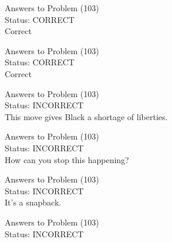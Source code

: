 \documentclass[11pt]{article}
\begin{document}
\begin{minipage}[t]{0.5\textwidth}
  {\centering
  
  Answers to Problem (103)\\
  Status: CORRECT\\
  Correct\\
  }
\end{minipage}
\begin{minipage}[t]{0.5\textwidth}
  {\centering
  
  Answers to Problem (103)\\
  Status: CORRECT\\
  Correct\\
  }
\end{minipage}
\begin{minipage}[t]{0.5\textwidth}
  {\centering
  
  Answers to Problem (103)\\
  Status: INCORRECT\\
  This move gives Black a shortage of liberties.\\
  }
\end{minipage}
\begin{minipage}[t]{0.5\textwidth}
  {\centering
  
  Answers to Problem (103)\\
  Status: INCORRECT\\
  How can you stop this happening?\\
  }
\end{minipage}
\begin{minipage}[t]{0.5\textwidth}
  {\centering
  
  Answers to Problem (103)\\
  Status: INCORRECT\\
  It's a snapback.\\
  }
\end{minipage}
\begin{minipage}[t]{0.5\textwidth}
  {\centering
  
  Answers to Problem (103)\\
  Status: INCORRECT\\
  
  }
\end{minipage}
\end{document}
